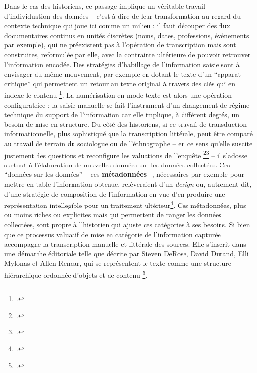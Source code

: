 Dans le cas des historiens, ce passage implique un véritable travail d’individuation des données -- c'est-à-dire de leur transformation au regard du contexte technique qui joue ici comme un milieu : il faut découper des flux documentaires continus en unités discrètes (noms, dates, professions, événements par exemple), qui ne préexistent pas à l’opération de transcription mais sont construites, reformulée par elle, avec la contrainte ultérieure de pouvoir retrouver l'information encodée. Des stratégies d'habillage de l'information saisie sont à envisager du même mouvement, par exemple en dotant le texte d'un \enquote{apparat critique} qui permettent un retour au texte original à travers des clés qui en indexe le contenu \footcite[][]{vancampenhoudt}. La numérisation en mode texte est alors une opération configuratrice : la saisie manuelle se fait l’instrument d’un changement de régime technique du support de l'information car elle implique, à différent degrés, un besoin de mise en structure. Du côté des historiens, si ce travail de transduction informationnelle, plus sophistiqué que la transcription littérale, peut être comparé au travail de terrain du sociologue ou de l'éthnographe -- en ce sens qu'elle suscite justement des questions et reconfigure les valuations de l'enquête \footcite[][]{zalc}\footcite[][]{dewey} -- il s'adosse surtout à l'élaboration de nouvelles données sur les données collectées. Ces \enquote{données sur les données} -- ces \textbf{métadonnées} --, nécessaires par exemple pour mettre en table l'information obtenue, relèveraient d'un \emph{design} ou, autrement dit, d'une stratégie de composition de l'information en vue d'en produire une représentation intellegible pour un traitement ultérieur\footcite[][]{renon}. Ces métadonnées, plus ou moins riches ou explicites mais qui permettent de ranger les données collectées, sont propre à l'historien qui ajuste ces catégories à ses besoins. Si bien que ce processus valuatif de mise en catégorie de l'information capturée accompagne la transcription manuelle et littérale des sources. Elle s'inscrit dans une démarche éditoriale telle que décrite par Steven DeRose, David Durand, Elli Mylonas et Allen Renear, qui se représentent le texte comme une structure hiérarchique ordonnée d'objets et de contenu \footcite[][]{derose}. 


